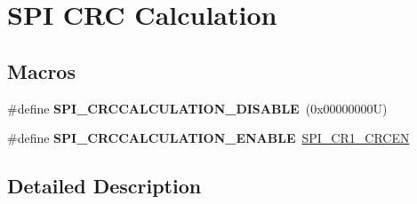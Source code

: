 \hypertarget{group___s_p_i___c_r_c___calculation}{}\section{S\+PI C\+RC Calculation}
\label{group___s_p_i___c_r_c___calculation}
\subsection*{Macros}
\begin{DoxyCompactItemize}
\item 
\mbox{\label{group___s_p_i___c_r_c___calculation_ga9cd586b66473d7f207103a443280820e}} 
\#define {\bfseries S\+P\+I\+\_\+\+C\+R\+C\+C\+A\+L\+C\+U\+L\+A\+T\+I\+O\+N\+\_\+\+D\+I\+S\+A\+B\+LE}~(0x00000000\+U)
\item 
\mbox{\label{group___s_p_i___c_r_c___calculation_ga431d368997c9c41e8923cbcd41b00123}} 
\#define {\bfseries S\+P\+I\+\_\+\+C\+R\+C\+C\+A\+L\+C\+U\+L\+A\+T\+I\+O\+N\+\_\+\+E\+N\+A\+B\+LE}~\mbox{\hyperlink{group___peripheral___registers___bits___definition_gac9339b7c6466f09ad26c26b3bb81c51b}{S\+P\+I\+\_\+\+C\+R1\+\_\+\+C\+R\+C\+EN}}
\end{DoxyCompactItemize}


\subsection{Detailed Description}
